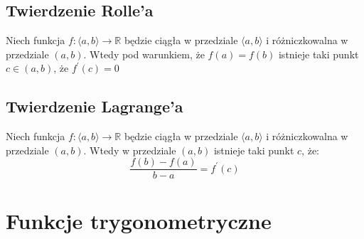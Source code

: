 \documentclass[14pt,a4paper]{extarticle}
\begin{document}
\subsection{Twierdzenie Rolle'a}
\noindent Niech funkcja $f:\langle a, b\rangle \rightarrow \mathbb{R}$ będzie ciągła w przedziale
$\langle a, b\rangle$ i różniczkowalna w przedziale $(a, b)$. Wtedy pod warunkiem, że $f(a) = f(b)$
istnieje taki punkt $c \in (a, b)$, że $f^{\prime}(c) = 0$

\subsection{Twierdzenie Lagrange'a}
\noindent Niech funkcja $f:\langle a, b\rangle \rightarrow \mathbb{R}$ będzie ciągła w przedziale
$\langle a, b\rangle$ i różniczkowalna w przedziale $(a, b)$. Wtedy w przedziale $(a, b)$ istnieje
taki punkt $c$, że:
\[\dfrac{f(b) - f(a)}{b - a} = f^{\prime}(c)\]











\newpage

\section{Funkcje trygonometryczne}
\end{document}
